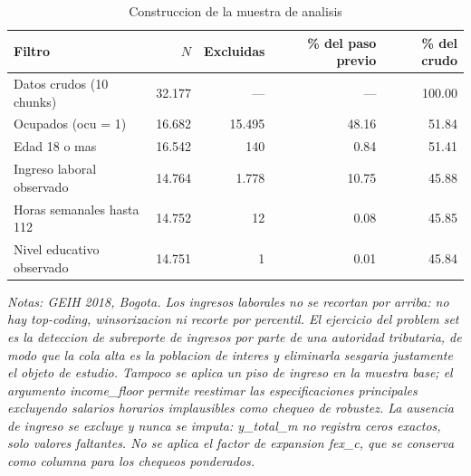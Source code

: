 \begin{table}[htbp]
\centering
\caption{Construccion de la muestra de analisis}
\label{tab:sample-construction}
\begin{tabular}{lrrrr}
\toprule
Filtro & $N$ & Excluidas & \% del paso previo & \% del crudo \\
\midrule
Datos crudos (10 chunks) & 32.177 & --- & --- & 100.00 \\
Ocupados (ocu = 1) & 16.682 & 15.495 & 48.16 & 51.84 \\
Edad 18 o mas & 16.542 & 140 & 0.84 & 51.41 \\
Ingreso laboral observado & 14.764 & 1.778 & 10.75 & 45.88 \\
Horas semanales hasta 112 & 14.752 & 12 & 0.08 & 45.85 \\
Nivel educativo observado & 14.751 & 1 & 0.01 & 45.84 \\
\bottomrule
\end{tabular}
\begin{minipage}{0.95\textwidth}
\footnotesize
\textit{Notas: GEIH 2018, Bogota. Los ingresos laborales no se recortan por arriba: no hay top-coding, winsorizacion ni recorte por percentil. El ejercicio del problem set es la deteccion de subreporte de ingresos por parte de una autoridad tributaria, de modo que la cola alta es la poblacion de interes y eliminarla sesgaria justamente el objeto de estudio. Tampoco se aplica un piso de ingreso en la muestra base; el argumento income_floor permite reestimar las especificaciones principales excluyendo salarios horarios implausibles como chequeo de robustez. La ausencia de ingreso se excluye y nunca se imputa: y_total_m no registra ceros exactos, solo valores faltantes. No se aplica el factor de expansion fex_c, que se conserva como columna para los chequeos ponderados.}
\end{minipage}
\end{table}

